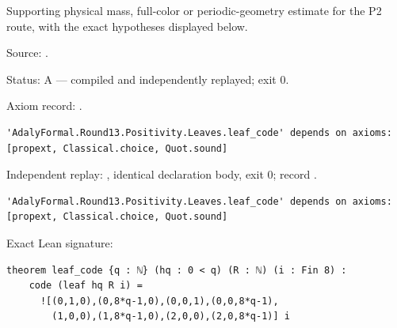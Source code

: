 \begin{theorem}[bp-438]
\label{bp-438}
\uses{}
\leanok
Supporting physical mass, full-color or periodic-geometry estimate for the P2 route, with the exact hypotheses displayed below.

\par Source: \texttt{}.
\par Status: A — compiled and independently replayed; exit 0.
\par Axiom record: \texttt{}.
\begin{verbatim}
'AdalyFormal.Round13.Positivity.Leaves.leaf_code' depends on axioms: [propext, Classical.choice, Quot.sound]
\end{verbatim}
\par Independent replay: \texttt{}, identical declaration body, exit 0; record \texttt{}.
\begin{verbatim}
'AdalyFormal.Round13.Positivity.Leaves.leaf_code' depends on axioms: [propext, Classical.choice, Quot.sound]
\end{verbatim}
\par Exact Lean signature:
\begin{verbatim}
theorem leaf_code {q : ℕ} (hq : 0 < q) (R : ℕ) (i : Fin 8) :
    code (leaf hq R i) =
      ![(0,1,0),(0,8*q-1,0),(0,0,1),(0,0,8*q-1),
        (1,0,0),(1,8*q-1,0),(2,0,0),(2,0,8*q-1)] i
\end{verbatim}
\end{theorem}


